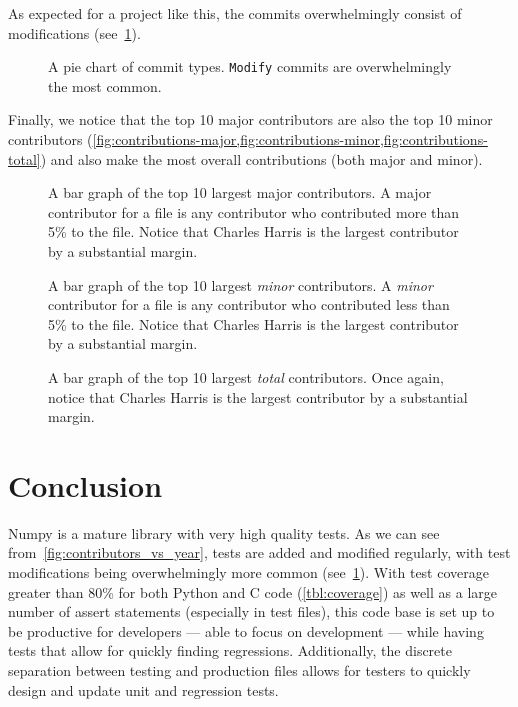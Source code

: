 \documentclass{article}
\begin{document}
As expected for a project like this, the commits overwhelmingly consist of modifications (see~\cref{fig:contributor_actions}).
\begin{figure}[H]
    \centering
    
    \caption{A pie chart of commit types. \texttt{Modify} commits are overwhelmingly
    the most common.}
    \label{fig:contributor_actions}
\end{figure}

Finally, we notice that the top 10 major contributors are also the top 10 minor contributors (\cref{fig:contributions-major,fig:contributions-minor,fig:contributions-total}) and also
make the most overall contributions (both major and minor). 

\begin{figure}[H]
    \centering
    
    \caption{A bar graph of the top 10 largest major contributors. A major contributor
    for a file is any contributor who contributed more than 5\% to the file. Notice that
    Charles Harris is the largest contributor by a substantial margin.}
    \label{fig:contributions-major}
\end{figure}

\begin{figure}[H]
    \centering
    
    \caption{A bar graph of the top 10 largest \emph{minor} contributors. A \emph{minor} contributor
    for a file is any contributor who contributed less than 5\% to the file. Notice that
    Charles Harris is the largest contributor by a substantial margin.}
    \label{fig:contributions-minor}
\end{figure}

\begin{figure}[H]
    \centering
    
    \caption{A bar graph of the top 10 largest \emph{total} contributors. Once again, notice that
    Charles Harris is the largest contributor by a substantial margin.}
    \label{fig:contributions-total}
\end{figure}

\section{Conclusion}
Numpy is a mature library with very high quality tests. As we can see from~\cref{fig:contributors_vs_year},
tests are added and modified regularly, with test modifications being overwhelmingly more common
(see~\cref{fig:contributor_actions}). With test coverage greater than 80\% for both Python and C code (\cref{tbl:coverage})
as well as a large number of assert statements (especially in test files), this code base is set up
to be productive for developers --- able to focus on development --- while having tests that allow
for quickly finding regressions. Additionally, the discrete separation between testing and production
files allows for testers to quickly design and update unit and regression tests.
\printbibliography
\end{document}
